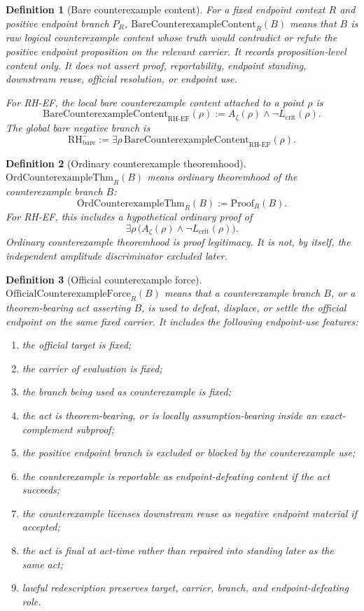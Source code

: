 \documentclass[11pt]{article}
\newtheorem{definition}{Definition}[section]
\newcommand{\Az}{A_{\zeta}}
\newcommand{\Lcrit}{L_{\mathrm{crit}}}
\newcommand{\RH}{\mathrm{RH}}
\newcommand{\EF}{\mathrm{EF}}
\newcommand{\BareCx}{\mathrm{BareCounterexampleContent}}
\newcommand{\OrdCxThm}{\mathrm{OrdCounterexampleThm}}
\newcommand{\OfficialCxForce}{\mathrm{OfficialCounterexampleForce}}
\begin{document}
\begin{definition}[Bare counterexample content]
For a fixed endpoint context \(R\) and positive endpoint branch \(P_R\), \(\BareCx_R(B)\) means that \(B\) is raw logical counterexample content whose truth would contradict or refute the positive endpoint proposition on the relevant carrier. It records proposition-level content only. It does not assert proof, reportability, endpoint standing, downstream reuse, official resolution, or endpoint use.

For RH-EF, the local bare counterexample content attached to a point \(\rho\) is
\[
\BareCx_{\RH\text{-}\EF}(\rho):=\Az(\rho)\wedge\neg\Lcrit(\rho).
\]
The global bare negative branch is
\[
\RH^-_{\mathrm{bare}}:=\exists \rho\,\BareCx_{\RH\text{-}\EF}(\rho).
\]
\end{definition}

\begin{definition}[Ordinary counterexample theoremhood]
\(\OrdCxThm_R(B)\) means ordinary theoremhood of the counterexample branch \(B\):
\[
\OrdCxThm_R(B):=\mathrm{Proof}_R(B).
\]
For RH-EF, this includes a hypothetical ordinary proof of
\[
\exists \rho\,\bigl(\Az(\rho)\wedge\neg\Lcrit(\rho)\bigr).
\]
Ordinary counterexample theoremhood is proof legitimacy. It is not, by itself, the independent amplitude discriminator excluded later.
\end{definition}

\begin{definition}[Official counterexample force]
\(\OfficialCxForce_R(B)\) means that a counterexample branch \(B\), or a theorem-bearing act asserting \(B\), is used to defeat, displace, or settle the official endpoint on the same fixed carrier. It includes the following endpoint-use features:
\begin{enumerate}
\item the official target is fixed;
\item the carrier of evaluation is fixed;
\item the branch being used as counterexample is fixed;
\item the act is theorem-bearing, or is locally assumption-bearing inside an exact-complement subproof;
\item the positive endpoint branch is excluded or blocked by the counterexample use;
\item the counterexample is reportable as endpoint-defeating content if the act succeeds;
\item the counterexample licenses downstream reuse as negative endpoint material if accepted;
\item the act is final at act-time rather than repaired into standing later as the same act;
\item lawful redescription preserves target, carrier, branch, and endpoint-defeating role.
\end{enumerate}
\end{definition}
\end{document}
